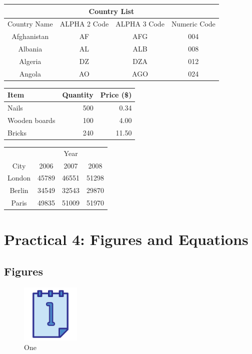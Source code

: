 \documentclass[a4paper,12pt]{report}
\begin{document}
\begin{tabular}{|c|c|c|c|}
\hline
\multicolumn{4}{|c|}{Country List}\\
\hline
Country Name & ALPHA 2 Code & ALPHA 3 Code & Numeric Code\\
\hline
Afghanistan & AF & AFG & 004\\
Albania & AL & ALB & 008\\
Algeria & DZ & DZA & 012\\
Angola & AO & AGO & 024\\
\hline
\end{tabular}

\newpage

\begin{tabular}{l|r|r}
Item & Quantity & Price (\$)\\
\hline
Nails & 500 & 0.34\\
Wooden boards & 100 & 4.00\\
Bricks & 240 & 11.50\\
\end{tabular}

\begin{tabular}{c|ccc}
	& \multicolumn{3}{c}{Year}\\
\cline{2-4}
City & 2006 & 2007 & 2008\\
\hline
London & 45789 & 46551 & 51298\\
Berlin & 34549 & 32543 & 29870\\
Paris & 49835 & 51009 & 51970\\
\end{tabular}

\chapter*{Practical 4: Figures and Equations}

\section{Figures}

\begin{figure}[h]
\centering
\includegraphics[width=0.25\textwidth]{1}
\caption{One}
\label{image-1} %
\end{figure}
\end{document}
